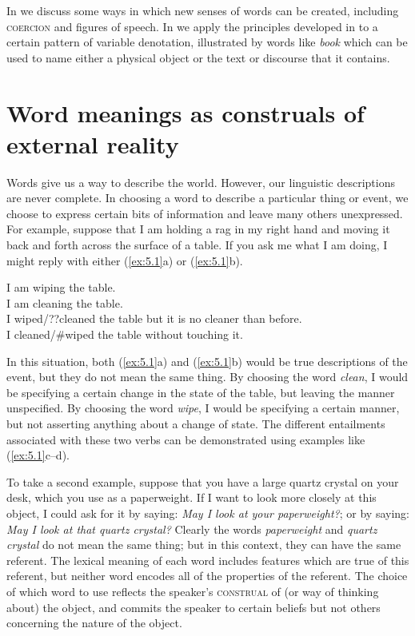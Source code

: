 In  we discuss some ways in which new senses of words can be created, including \textsc{coercion} and figures of speech. In  we apply the principles developed in  to a certain pattern of variable denotation, illustrated by words like \textit{book} which can be used to name either a physical object or the text or discourse that it contains.


\section{Word meanings as construals of external reality}\label{sec:} %

Words give us a way to describe the world. However, our linguistic descriptions are never complete. In choosing a word to describe a particular thing or event, we choose to express certain bits of information and leave many others unexpressed. For example, suppose that I am holding a rag in my right hand and moving it back and forth across the surface of a table. If you ask me what I am doing, I might reply with either (\ref{ex:5.1}a) or (\ref{ex:5.1}b).


\ea \label{ex:5.1}
\ea I am wiping the table.\\
\ex I am cleaning the table.\\
\ex I wiped/??cleaned the table but it is no cleaner than before.\\
\ex I cleaned/\#wiped the table without touching it.
                       \z
\z


In this situation, both (\ref{ex:5.1}a) and (\ref{ex:5.1}b) would be true descriptions of the event, but they do not mean the same thing. By choosing the word \textit{clean}, I would be specifying a certain change in the state of the table, but leaving the manner unspecified. By choosing the word \textit{wipe}, I would be specifying a certain manner, but not asserting anything about a change of state. The different entailments associated with these two verbs can be demonstrated using examples like (\ref{ex:5.1}c--d).



To take a second example, suppose that you have a large quartz crystal on your desk, which you use as a paperweight. If I want to look more closely at this object, I could ask for it by saying: \textit{May I look at your paperweight?}; or by saying: \textit{May I look at that quartz crystal?} Clearly the words \textit{paperweight} and \textit{quartz crystal} do not mean the same thing; but in this context, they can have the same referent. The lexical meaning of each word includes features which are true of this referent, but neither word encodes all of the properties of the referent. The choice of which word to use reflects the speaker’s \textsc{construal} of (or way of thinking about) the object, and commits the speaker to certain beliefs but not others concerning the nature of the object.



